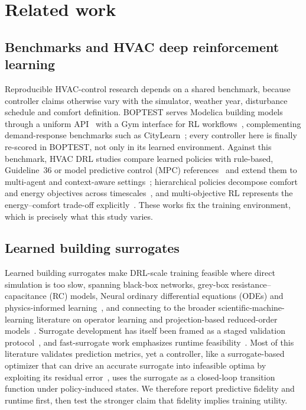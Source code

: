 \section{Related work}\label{sec:related}

\subsection{Benchmarks and HVAC deep reinforcement learning}
Reproducible HVAC-control research depends on a shared benchmark, because controller claims
otherwise vary with the simulator, weather year, disturbance schedule and comfort definition.
BOPTEST serves Modelica building models through a uniform
API~\cite{Blum2021BOPTEST,Wetter2014Modelica} with a Gym interface for RL
workflows~\cite{Arroyo2021GymBOPTEST}, complementing demand-response benchmarks such as
CityLearn~\cite{VazquezCanteli2019CityLearn,VazquezCanteli2019Review}; every controller here is
finally re-scored in BOPTEST, not only in its learned environment. Against this benchmark, HVAC DRL
studies compare learned policies with rule-based, Guideline~36 or model predictive control (MPC)
references~\cite{Savino2025ASHRAE,Wang2025SafeDRL,Nguyen2024Modelling,Sun2024DirectTSup} and extend
them to multi-agent and context-aware
settings~\cite{Deng2025MultiAgent,Alotaibi2025ContextAware}; hierarchical policies decompose
comfort and energy objectives across timescales~\cite{Liao2025HDRL,Bacon2017Options,Nachum2018HIRO},
and multi-objective RL represents the energy--comfort trade-off
explicitly~\cite{Yang2019MORL,Roijers2013MOSurvey,Hayes2022MOSurvey,Byeon2025MaxMinMORL}. These
works fix the training environment, which is precisely what this study varies.

\subsection{Learned building surrogates}
Learned building surrogates make DRL-scale training feasible where direct simulation is too slow,
spanning black-box networks, grey-box resistance--capacitance (RC) models, Neural ordinary differential equations (ODEs) and physics-informed
learning~\cite{Bacher2011RCIdentification,Berthou2014RC,Bunning2020RC,Picard2017WhiteBox,Raissi2019PINN,Chen2018NeuralODE,Karpatne2017TheoryGuided,Willard2022PIML,Hedayat2025PINN},
and connecting to the broader scientific-machine-learning literature on operator learning and
projection-based reduced-order models~\cite{Lu2021DeepONet,Li2021FNO,Benner2015ROM}. Surrogate
development has itself been framed as a staged validation protocol~\cite{HouEvins2024}, and
fast-surrogate work emphasizes runtime feasibility~\cite{Mshragi2026FastML}. Most of this literature
validates prediction metrics, yet a controller, like a surrogate-based optimizer that can drive an
accurate surrogate into infeasible optima by exploiting its residual error~\cite{Jones1998EGO}, uses
the surrogate as a closed-loop transition function under policy-induced states. We therefore report
predictive fidelity and runtime first, then test the stronger claim that fidelity implies training
utility.

